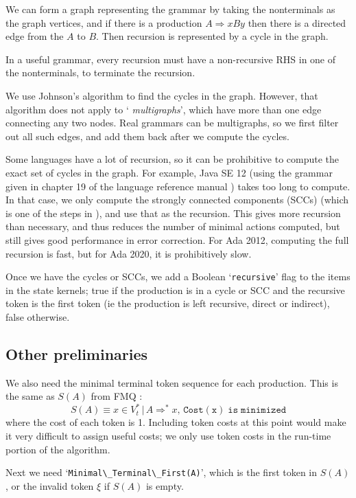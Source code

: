 \documentclass{article}
\newcommand{\code}[1]{`\lstinline|#1|'}
\begin{document}
We can form a graph representing the grammar by taking the
nonterminals as the graph vertices, and if there is a production $A
\Rightarrow xBy$ then there is a directed edge from the $A$ to $B$.
Then recursion is represented by a cycle in the graph.

In a useful grammar, every recursion must have a non-recursive
RHS in one of the nonterminals, to terminate the recursion.

We use Johnson's algorithm \cite{graph-cycles} to find the cycles in
the graph. However, that algorithm does not apply to `{\it
  multigraphs}', which have more than one edge connecting any two
nodes. Real grammars can be multigraphs, so we first filter out all
such edges, and add them back after we compute the cycles.

Some languages have a lot of recursion, so it can be prohibitive to
compute the exact set of cycles in the graph. For example, Java SE 12
(using the grammar given in chapter 19 of the language reference
manual \cite{javarm}) takes too long to compute. In that case, we only
compute the strongly connected components (SCCs) (which is one of the
steps in \cite{graph-cycles}), and use that as the recursion. This
gives more recursion than necessary, and thus reduces the number of
minimal actions computed, but still gives good performance in error
correction. For Ada 2012, computing the full recursion is fast, but
for Ada 2020, it is prohibitively slow.

Once we have the cycles or SCCs, we add a Boolean \code{recursive}
flag to the items in the state kernels; true if the production is in a
cycle or SCC and the recursive token is the first token (ie the
production is left recursive, direct or indirect), false otherwise.

\subsection{Other preliminaries}
We also need the minimal terminal token sequence for each production.
This is the same as $S(A)$ from FMQ \cite{FMQ 1980}:
\begin{equation}
S(A) \equiv x \in V_t^* \, |\, A \Rightarrow^* x, \, \mathtt{Cost(x)\; is\; minimized}
\end{equation}
where the cost of each token is 1. Including token costs at this point
would make it very difficult to assign useful costs; we only use token
costs in the run-time portion of the algorithm.

Next we need \code{Minimal\_Terminal\_First(A)}, which is the first
token in $S(A)$, or the invalid token $\xi$ if $S(A)$ is empty.
\end{document}
